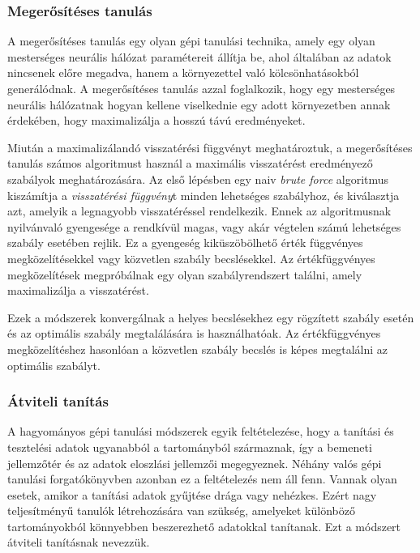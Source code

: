 \documentclass[12pt,a4]{article}
\begin{document}
	\subsubsection{Megerősítéses tanulás}
	
	A megerősítéses tanulás egy olyan gépi tanulási technika, amely egy olyan
	mesterséges neurális hálózat paramétereit állítja be, ahol általában az adatok nincsenek előre megadva, hanem a környezettel való kölcsönhatásokból generálódnak. A megerősítéses tanulás azzal foglalkozik, hogy egy mesterséges neurális hálózatnak hogyan kellene viselkednie egy adott környezetben annak érdekében, hogy maximalizálja a hosszú távú 
	eredményeket.
	
	Miután a maximalizálandó visszatérési függvényt meghatároztuk, a megerősítéses tanulás számos algoritmust használ a maximális visszatérést eredményező szabályok meghatározására. Az első lépésben egy naiv \textit{brute force} algoritmus kiszámítja a \textit{visszatérési függvény}t minden lehetséges szabályhoz, és kiválasztja azt, amelyik a legnagyobb visszatéréssel rendelkezik. Ennek az algoritmusnak nyilvánvaló gyengesége a rendkívül magas, vagy akár végtelen számú lehetséges szabály esetében rejlik. Ez a gyengeség kiküszöbölhető érték függvényes megközelítésekkel vagy közvetlen szabály becslésekkel. Az értékfüggvényes megközelítések megpróbálnak
	egy olyan szabályrendszert találni, amely maximalizálja a visszatérést.
	
	Ezek a módszerek konvergálnak a helyes becslésekhez egy rögzített szabály esetén és az optimális szabály megtalálására is használhatóak. Az értékfüggvényes megközelítéshez hasonlóan a közvetlen szabály becslés is képes megtalálni az optimális szabályt.

    \subsubsection{Átviteli tanítás}
    
     A hagyományos gépi tanulási módszerek \cite{tl} egyik feltételezése, hogy a tanítási és tesztelési adatok ugyanabból a tartományból származnak, így a bemeneti jellemzőtér és az adatok eloszlási jellemzői megegyeznek. Néhány valós gépi tanulási forgatókönyvben azonban ez a feltételezés nem áll fenn. Vannak olyan esetek, amikor a tanítási adatok gyűjtése drága vagy nehézkes. Ezért nagy teljesítményű tanulók létrehozására van szükség, amelyeket különböző tartományokból könnyebben beszerezhető adatokkal tanítanak. Ezt a módszert átviteli tanításnak nevezzük.
\end{document}
